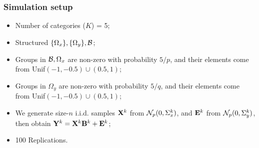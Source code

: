 \documentclass[10pt]{beamer}
\theoremstyle{definition}
\begin{document}
\begin{frame}
\frametitle{Simulation setup}
\begin{itemize}
\item Number of categories ($K$) = 5;

\item Structured $\{ \Omega_x\}, \{\Omega_y\}, {\cal{B}}$;

\item Groups in ${\cal{B}},\Omega_x$ are non-zero with probability $5/p$, and their elements come from Unif$(-1, -0.5) \cup (0.5,1)$;

\item Groups in $\Omega_y$ are non-zero with probability $5/q$, and their elements come from Unif$(-1, -0.5) \cup (0.5,1)$;

\item We generate size-$n$ i.i.d. samples ${\mathbf{X}}^k$ from ${\cal{N}}_p(0, \Sigma_x^k)$, and ${\mathbf{E}}^k$ from ${\cal{N}}_p(0, \Sigma_y^k)$, then obtain ${\mathbf{Y}}^k = {\mathbf{X}}^k {\mathbf{B}}^k + {\mathbf{E}}^k$;
\item 100 Replications.

\end{itemize}
\end{frame}
\end{document}
